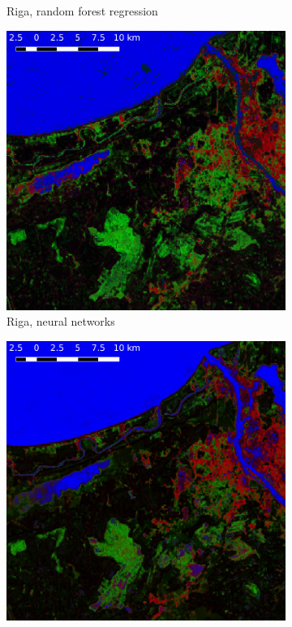 \documentclass[a4paper,12pt]{scrbook}
\begin{document}
\begin{figure}
\begin{subfigure}[t]{.24\textwidth}
    \caption{Riga, random forest regression}
    \label{subfig-riga-rf}
  \end{subfigure} \hfill
  \begin{subfigure}[t]{.24\textwidth}
    \includegraphics[width=\textwidth]{thesis-figures/figures-qgis/riga-nn}
    \caption{Riga, neural networks}
    \label{subfig-riga-nn}
  \end{subfigure} \hfill
  \begin{subfigure}[t]{.24\textwidth}
    \includegraphics[width=\textwidth]{thesis-figures/figures-qgis/riga-cm}

\end{subfigure}
\end{figure}
\end{document}
